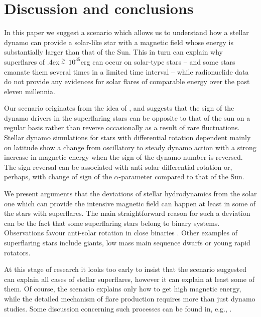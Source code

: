\documentclass[fleqn,12pt]{SelfArx} %
\begin{document}
 

\section{Discussion and conclusions}

In this paper we suggest a scenario which allows us to understand how a stellar dynamo can provide a solar-like 
star with a magnetic field whose energy is substantially larger than that of the Sun. This in turn can explain 
why superflares of {\lower.4ex\hbox{$\;\buildrel >\over{\scriptstyle\sim}\;$}}$10^{35}$erg can occur on 
solar-type stars -- and some stars emanate them several times in a limited time interval -- while radionuclide 
data do not provide any evidences for solar flares of comparable energy over the past eleven millennia.

Our scenario originates from the idea of \cite{1}, and suggests that the sign of the dynamo drivers in the 
superflaring stars can be opposite to that of the sun on a regular basis rather than reverse occasionally as a result of rare 
fluctuations. Stellar dynamo simulations for  stars with  differential rotation dependent mainly on latitude show 
a change from oscillatory to steady dynamo
action with a strong increase in magnetic energy when the sign of the dynamo number is reversed. The sign 
reversal can be associated with anti-solar differential rotation or, perhaps, with change of sign of the 
$\alpha$-parameter compared to that of the Sun.

We present arguments that the deviations of stellar hydrodynamics from the solar one which can provide the 
intensive magnetic field can happen at least in some of the stars with superflares. The main straightforward 
reason for such a deviation can be the fact that some superflaring stars belong to binary systems. Observations 
favour anti-solar rotation in close binaries \cite{42}. Other examples of superflaring stars include giants, low mass 
main sequence dwarfs or young rapid rotators.

At this stage of research it looks too early to insist that the scenario suggested can explain all cases of 
stellar superflares, however it  can
explain at least some of them. Of course, the scenario explains only how to get high magnetic energy, while the 
detailed mechanism of flare production requires more than just dynamo studies. Some discussion concerning such 
processes can be found in, e.g., \cite{29,49}.
\end{document}
